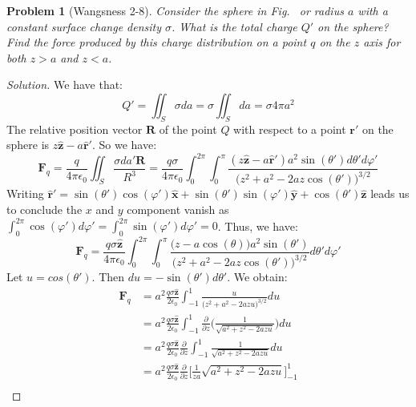 \documentclass{article}
\theoremstyle{mystyle}
\newtheorem{problem}{Problem}[section]
\begin{document}
\begin{problem}[Wangsness 2-8]
    Consider the sphere in Fig.~ or radius $a$ with a constant surface change density $\sigma$. What is the total charge $Q'$ on the sphere? Find the force produced by this charge distribution on a point $q$ on the $z$ axis for both $z>a$ and $z<a$.
\end{problem}
\begin{proof}[Solution]
We have that:
\begin{equation*}
    Q' = \iint_{S} \sigma da = \sigma \iint_{S}da = \sigma 4\pi a^{2}
\end{equation*}
The relative position vector $\mathbf{R}$ of the point $Q$ with respect to a point $\mathbf{r}'$ on the sphere is $z\hat{\mathbf{z}} - a\hat{\mathbf{r}}'$. So we have:
\begin{equation*}
    \mathbf{F}_q = \frac{q}{4\pi \epsilon_0} \iint_{S} \frac{\sigma da'\mathbf{R}}{R^3}=\frac{q\sigma}{4\pi \epsilon_0} \int_{0}^{2\pi} \int_{0}^{\pi} \frac{(z\hat{\mathbf{z}}-a\hat{\mathbf{r}}')a^2\sin(\theta')d\theta ' d\varphi '}{\big(z^2+a^2-2az\cos(\theta')\big)^{3/2}}    
\end{equation*}
Writing $\hat{\mathbf{r}}' = \sin(\theta')\cos(\varphi')\hat{\mathbf{x}} + \sin(\theta')\sin(\varphi')\hat{\mathbf{y}}+\cos(\theta')\hat{\mathbf{z}}$ leads us to conclude the $x$ and $y$ component vanish as $\int_{0}^{2\pi} \cos(\varphi')d\varphi' = \int_{0}^{2\pi}\sin(\varphi')d\varphi' = 0$. Thus, we have: 
\begin{equation*}
    \mathbf{F}_q = \frac{q\sigma\hat{\mathbf{z}}}{4\pi \epsilon_{0}}\int_{0}^{2\pi}\int_{0}^{\pi}\frac{\big(z-a\cos(\theta)\big)a^{2}\sin(\theta')}{\big(z^{2}+a^{2}-2az\cos(\theta')\big)^{3/2}}d\theta' d\varphi'
\end{equation*}
Let $u = cos(\theta')$. Then $du = -\sin(\theta')d\theta'$. We obtain:
\begin{align*}
    \mathbf{F}_{q} &= a^{2}\frac{q\sigma \hat{\mathbf{z}}}{2\epsilon_{0}}\int_{-1}^{1}\frac{u}{\big(z^{2}+a^{2}-2azu\big)^{3/2}}du\\
    &= a^{2}\frac{q\sigma \hat{\mathbf{z}}}{2\epsilon_{0}}\int_{-1}^{1}\frac{\partial}{\partial z} \bigg(\frac{1}{\sqrt{a^{2}+z^{2}-2azu}}\bigg)du\\
    &= a^{2}\frac{q\sigma \hat{\mathbf{z}}}{2\epsilon_{0}}\frac{\partial}{\partial z} \int_{-1}^{1}\frac{1}{\sqrt{a^{2}+z^{2}-2azu}}du\\
    &= a^{2}\frac{q\sigma \hat{\mathbf{z}}}{2\epsilon_{0}}\frac{\partial}{\partial z} \bigg[\frac{1}{za}\sqrt{a^{2}+z^{2}-2azu}\bigg]_{-1}^{1}\\

\end{align*}
\end{proof}
\end{document}
